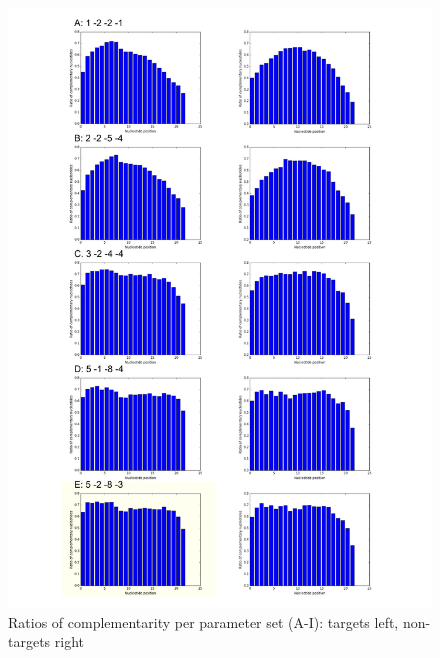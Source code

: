 \documentclass[11pt, a4paper, oneside]{book}
\begin{document}
\begin{figure}
\vspace{-1cm}
\hspace{-1.2cm}
\includegraphics[scale=0.72]{results/compl1.pdf}
\caption{Ratios of complementarity per parameter set (A-I): targets left, non-targets right}
\label{ratios}
\end{figure}
\end{document}
